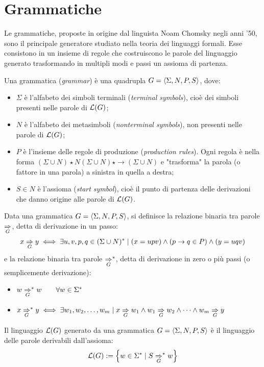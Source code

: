 \section{Grammatiche}
Le grammatiche, proposte in origine dal linguista Noam Chomsky negli anni '50, sono il principale generatore studiato nella teoria dei linguaggi formali. Esse consistono in un insieme di regole che costruiscono le parole del linguaggio generato trasformando in multipli modi e passi un assioma di partenza.
\begin{defin}[grammatica]
	Una grammatica (\emph{grammar}) è una quadrupla $G=\langle \Sigma,N,P,S \rangle$, dove:
	\begin{itemize}
		\item $\Sigma$ è l'alfabeto dei simboli terminali (\emph{terminal symbols}), cioè dei simboli presenti nelle parole di $\mathcal L(G)$;
		\item $N$ è l'alfabeto dei metasimboli (\emph{nonterminal symbols}), non presenti nelle parole di $\mathcal L(G)$;
		\item $P$ è l'insieme delle regole di produzione (\emph{production rules}). Ogni regola è nella forma $(\Sigma\cup N)\star N(\Sigma\cup N)\star\to(\Sigma\cup N)$ e "trasforma" la parola (o fattore in una parola) a sinistra in quella a destra;
		\item $S\in N$ è l'assioma (\emph{start symbol}), cioè il punto di partenza delle derivazioni che danno origine alle parole di $\mathcal L(G)$.
	\end{itemize}
	Data una grammatica $G=\langle \Sigma,N,P,S \rangle$, si definisce la relazione binaria tra parole $\underset{G}{\Rightarrow}$, detta di derivazione in un passo:
	\begin{equation*}
		x\underset{G}{\Rightarrow} y \iff \exists u,v,p,q\in(\Sigma\cup N)^* \mid (x=upv)\land(p\to q\in P)\land(y=uqv)
	\end{equation*}
	e la relazione binaria tra parole $\underset{G}{\Rightarrow}^*$, detta di derivazione in zero o più passi (o semplicemente derivazione):
	\begin{itemize}
		\item $w \underset{G}{\Rightarrow}^* w \qquad\forall w\in\Sigma^*$
		\item $x \underset{G}{\Rightarrow}^* y \iff \exists w_1,w_2,\dots,w_m \mid x\underset{G}{\Rightarrow} w_1 \land w_1\underset{G}{\Rightarrow} w_2 \land\dots\land w_m\underset{G}{\Rightarrow}y$
	\end{itemize}
	Il linguaggio $\mathcal L(G)$ generato da una grammatica $G=\langle \Sigma,N,P,S \rangle$ è il linguaggio delle parole derivabili dall'assioma:
	\begin{equation*}
		\mathcal L(G) := \left\{ w\in\Sigma^*\mid S\underset{G}{\Rightarrow}^* w \right\}
	\end{equation*}
\end{defin}


